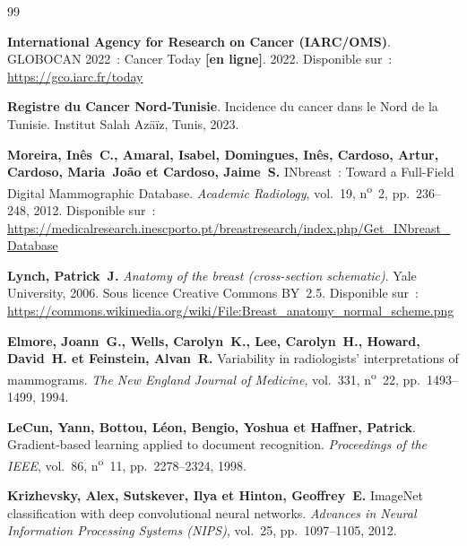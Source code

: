 
\adjustmtc
\renewcommand\bibname{BIBLIOGRAPHIE}
\begin{thebibliography}{99}
\thispagestyle{MyStyle}


\textbf{International Agency for Research on Cancer (IARC/OMS)}.
GLOBOCAN 2022~: Cancer Today \textbf{[en ligne]}. 2022.
Disponible sur~: \url{https://gco.iarc.fr/today}

\textbf{Registre du Cancer Nord-Tunisie}.
Incidence du cancer dans le Nord de la Tunisie.
Institut Salah Az\"a\"iz, Tunis, 2023.

\textbf{Moreira, In\^es~C., Amaral, Isabel, Domingues, In\^es,
Cardoso, Artur, Cardoso, Maria~Jo\~ao et Cardoso, Jaime~S.}
INbreast~: Toward a Full-Field Digital Mammographic Database.
\textit{Academic Radiology}, vol.~19, n\textsuperscript{o}~2,
pp.~236--248, 2012.
Disponible sur~: \url{https://medicalresearch.inescporto.pt/breastresearch/index.php/Get_INbreast_Database}

\textbf{Lynch, Patrick~J.}
\textit{Anatomy of the breast (cross-section schematic)}.
Yale University, 2006. Sous licence Creative Commons BY~2.5.
Disponible sur~: \url{https://commons.wikimedia.org/wiki/File:Breast_anatomy_normal_scheme.png}

\textbf{Elmore, Joann~G., Wells, Carolyn~K., Lee, Carolyn~H.,
Howard, David~H. et Feinstein, Alvan~R.}
Variability in radiologists' interpretations of mammograms.
\textit{The New England Journal of Medicine}, vol.~331,
n\textsuperscript{o}~22, pp.~1493--1499, 1994.

\textbf{LeCun, Yann, Bottou, L\'eon, Bengio, Yoshua et Haffner, Patrick}.
Gradient-based learning applied to document recognition.
\textit{Proceedings of the IEEE}, vol.~86, n\textsuperscript{o}~11,
pp.~2278--2324, 1998.

\textbf{Krizhevsky, Alex, Sutskever, Ilya et Hinton, Geoffrey~E.}
ImageNet classification with deep convolutional neural networks.
\textit{Advances in Neural Information Processing Systems (NIPS)},
vol.~25, pp.~1097--1105, 2012.


\end{thebibliography}
